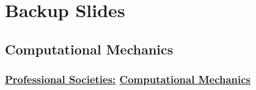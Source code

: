 % 

\section{Backup Slides}
\subsection{Computational Mechanics}

\begin{frame}\frametitle{\href{https://en.wikipedia.org/wiki/Computational_mechanics}{Professional Societies:} \href{https://en.wikipedia.org/wiki/Computational_mech}{Computational Mechanics}}
\end{frame}


\endinput  %
